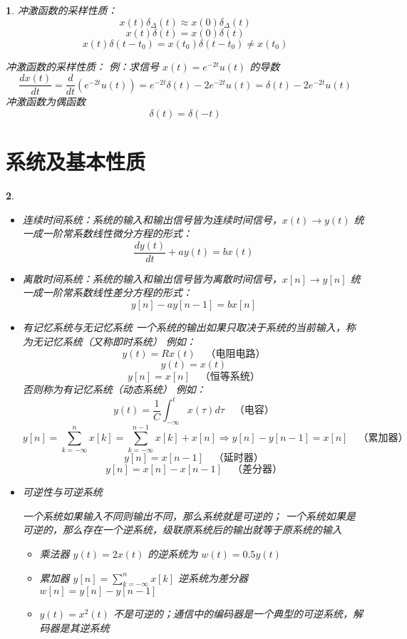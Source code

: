 \documentclass[UTF8]{report}
\theoremstyle{MyLineTheoremStyle} %
\theoremstyle{MyBlockTheoremStyle} %
\theoremstyle{MySubsubsectionStyle} %
\newtheorem{definition}{}
\begin{document}
\begin{definition}
    冲激函数的采样性质：
    \[
    x(t) \delta_\Delta(t) \approx x(0) \delta_\Delta(t)
    \]
    \[
    x(t) \delta(t) = x(0) \delta(t)
    \]
    \[
    x(t) \delta(t - t_0) = x(t_0) \delta(t - t_0) \neq x(t_0)
    \]

    冲激函数的采样性质：
    例：求信号 $x(t) = e^{-2t}u(t)$ 的导数
    \[
    \frac{d x(t)}{d t} = \frac{d}{d t} \left( e^{-2t}u(t) \right) = e^{-2t} \delta(t) - 2e^{-2t} u(t) = \delta(t) - 2e^{-2t} u(t)
    \]
    冲激函数为偶函数
    \[
    \delta(t) = \delta(-t)
    \]
\end{definition}

\section{系统及基本性质}

\begin{definition}
    \begin{itemize}
        \item 连续时间系统：系统的输入和输出信号皆为连续时间信号，$x(t) \rightarrow y(t)$
        统一成一阶常系数线性微分方程的形式：
        \[
        \frac{d y(t)}{d t} + a y(t) = b x(t)
        \]

        \item 离散时间系统：系统的输入和输出信号皆为离散时间信号，$x[n] \rightarrow y[n]$
        统一成一阶常系数线性差分方程的形式：
        \[
        y[n] - a y[n - 1] = b x[n]
        \]

        \item 有记忆系统与无记忆系统
        一个系统的输出如果只取决于系统的当前输入，称为无记忆系统（又称即时系统）
        例如：
        \[
        y(t) = R x(t) \quad \text{（电阻电路）}
        \]
        \[
        y(t) = x(t)
        \]
        \[
        y[n] = x[n] \quad \text{（恒等系统）}
        \]
        否则称为有记忆系统（动态系统）
        例如：
        \[
        y(t) = \frac{1}{C} \int_{-\infty}^{t} x(\tau) d\tau \quad \text{（电容）}
        \]
        \[
        y[n] = \sum_{k=-\infty}^{n} x[k] = \sum_{k=-\infty}^{n-1} x[k] + x[n] \Rightarrow y[n] - y[n-1] = x[n] \quad \text{（累加器）}
        \]
        \[
        y[n] = x[n-1] \quad \text{（延时器）}
        \]
        \[
        y[n] = x[n] - x[n-1] \quad \text{（差分器）}
        \]

        \item 可逆性与可逆系统\par
        一个系统如果输入不同则输出不同，那么系统就是可逆的；
        一个系统如果是可逆的，那么存在一个逆系统，级联原系统后的输出就等于原系统的输入
        \begin{itemize}
            \item 乘法器 $y(t) = 2x(t)$ 的逆系统为 $w(t) = 0.5y(t)$
            \item 累加器 $y[n] = \sum_{k=-\infty}^{n} x[k]$ 逆系统为差分器 $w[n] = y[n] - y[n-1]$
            \item $y(t) = x^2(t)$ 不是可逆的；通信中的编码器是一个典型的可逆系统，解码器是其逆系统
        \end{itemize}


\end{itemize}
\end{definition}
\end{document}
